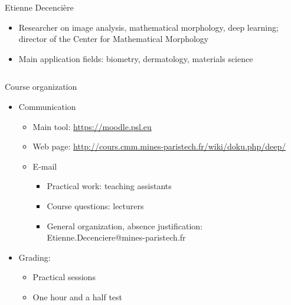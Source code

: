 \documentclass[xcolor=pdftex,dvipsnames,table,mathserif]{beamer}
\begin{document}
{\begin{columns}
\begin{column}{.8\textwidth}
    \begin{block}{Etienne Decencière}
      \scriptsize{
    \begin{itemize}
    \item Researcher on image analysis, mathematical morphology, deep learning; director of the Center for Mathematical Morphology
    \item Main application fields: biometry, dermatology, materials science
    \end{itemize}
    }
  \end{block}

  \end{column}
\end{columns}

}

\begin{frame}{Course organization}

  \begin{itemize}

  \item Communication
    \begin{itemize}
    \item Main tool: \url{https://moodle.psl.eu}
    \item Web page: \url{http://cours.cmm.mines-paristech.fr/wiki/doku.php/deep/}
    \item E-mail
      \begin{itemize}
      \item Practical work: teaching assistants
      \item Course questions: lecturers
      \item General organization, absence justification: Etienne.Decenciere@mines-paristech.fr
      \end{itemize}
    \end{itemize}
  \item Grading:
    \begin{itemize}
      \item Practical sessions
      \item One hour and a half test
    \end{itemize}

  \end{itemize}
\end{frame}
\end{document}
